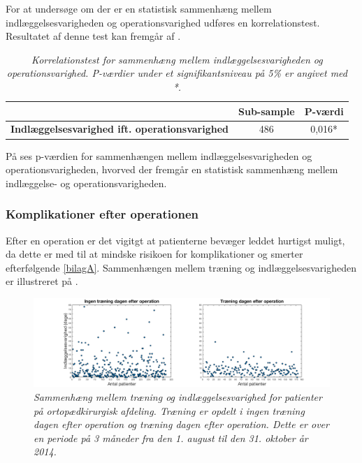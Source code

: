 For at undersøge om der er en statistisk sammenhæng mellem indlæggelsesvarigheden og operationsvarighed udføres en korrelationstest. Resultatet af denne test kan fremgår af .

\begin{table}[H]
\centering
\begin{tabular}{|c|c|c|}
\hline
\textbf{}  & \textbf{Sub-sample} & \textbf{P-værdi} \\ \hline
\textbf{Indlæggelsesvarighed ift. operationsvarighed} & 486                 & 0,016*           \\ \hline
\end{tabular}
\caption{\textit{Korrelationstest for sammenhæng mellem indlæggelsesvarigheden og operationsvarighed. P-værdier under et signifikantsniveau på 5\% er angivet med *.}}
\label{opogindlaegtab}
\end{table}

\noindent
På  ses p-værdien for sammenhængen mellem indlæggelsesvarigheden og operationsvarigheden, hvorved der fremgår en statistisk sammenhæng mellem indlæggelse- og operationsvarigheden. 

\subsubsection{Komplikationer efter operationen}
Efter en operation er det vigitgt at patienterne bevæger leddet hurtigst muligt, da dette er med til at mindske risikoen for komplikationer og smerter efterfølgende \ref{bilagA}\cite{Nordjylland2014}. Sammenhængen mellem træning og indlæggelsesvarigheden er illustreret på .

\begin{figure}[H]
	\centering
	\includegraphics[scale=0.35]{figures/traeningindlaeg.png}
	\caption{\textit{Sammenhæng mellem træning og indlæggelsesvarighed for patienter på ortopædkirurgisk afdeling. Træning er opdelt i ingen træning dagen efter operation og træning dagen efter operation. Dette er over en periode på 3 måneder fra den 1. august til den 31. oktober år 2014.}}
	\label{traeningindlaeg}
	\end{figure}

